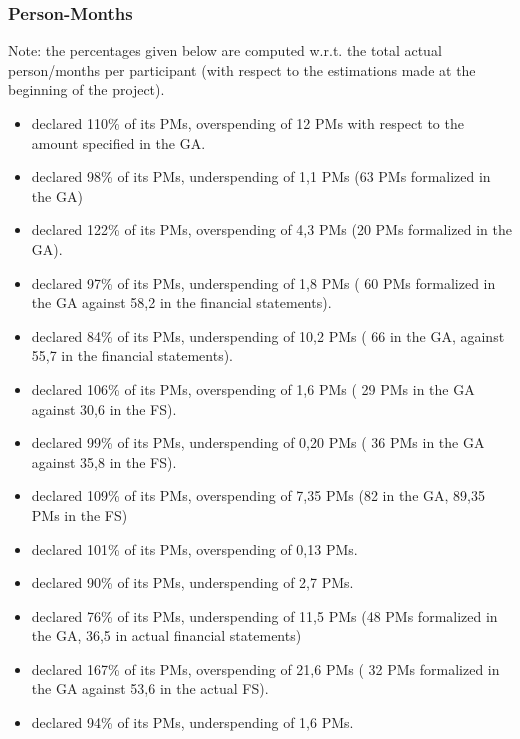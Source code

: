 \subsubsection{Person-Months}

Note: the percentages given below are computed w.r.t. the total actual
person/months per participant  (with respect to the estimations made 
at the beginning of the project).


\begin{itemize}
\item {} declared 110\% of its PMs, overspending of 12 PMs
with respect to the amount specified in the GA.
\item {} declared 98\% of its PMs, underspending of 1,1 PMs (63 PMs
  formalized in the GA) 
\item {} declared 122\% of its PMs, overspending of 4,3 PMs (20 PMs
  formalized in the GA).
\item {} declared 97\% of its PMs, underspending of 1,8 PMs ( 60 PMs 
formalized in the GA against 58,2 in the financial statements).
\item {} declared 84\% of its PMs, underspending of 10,2 PMs ( 66 in the
 GA, against 55,7 in the financial statements).
\item {} declared 106\% of its PMs, overspending of 1,6 PMs ( 29 PMs 
in the GA against 30,6 in the FS).
\item {} declared 99\% of its PMs, underspending of 0,20 PMs ( 36 PMs 
in the GA against 35,8 in the FS).
\item {} declared 109\% of its PMs, overspending of 7,35 PMs (82 in the GA,
 89,35 PMs in the FS)
\item {} declared 101\% of its PMs, overspending of 0,13 PMs.
\item {} declared 90\% of its PMs, underspending of 2,7 PMs.
\item {} declared 76\% of its PMs, underspending of 11,5 PMs (48 PMs
formalized in the GA, 36,5 in actual financial statements)
\item {} declared 167\% of its PMs, overspending of 21,6 PMs ( 32 PMs
formalized in the GA against 53,6 in the actual FS).
\item {} declared 94\% of its PMs, underspending of 1,6 PMs.

\end{itemize}
